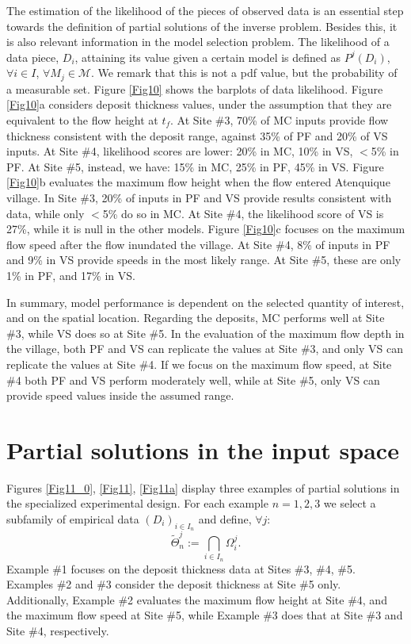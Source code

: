\documentclass[nhess, manuscript]{copernicus}
\begin{document}
The estimation of the likelihood of the pieces of observed data is an essential step towards the definition of partial solutions of the inverse problem. Besides this, it is also relevant information in the model selection problem. The likelihood of a data piece, $D_i$, attaining its value given a certain model is defined as $P^j(D_i)$, $\forall i\in I$, $\forall M_j\in \mathcal M$. We remark that this is not a pdf value, but the probability of a measurable set. Figure \ref{Fig10} shows the barplots of data likelihood. Figure \ref{Fig10}a considers deposit thickness values, under the assumption that they are equivalent to the flow height at $t_f$. At Site \#3, 70\% of MC inputs provide flow thickness consistent with the deposit range, against 35\% of PF and 20\% of VS inputs. At Site \#4, likelihood scores are lower: 20\% in MC, 10\% in VS, $<$5\% in PF. At Site \#5, instead, we have: 15\% in MC, 25\% in PF, 45\% in VS. Figure \ref{Fig10}b evaluates the maximum flow height when the flow entered Atenquique village. In Site \#3, 20\% of inputs in PF and VS provide results consistent with data, while only $<$5\% do so in MC. At Site \#4, the likelihood score of VS is 27\%, while it is null in the other models. Figure \ref{Fig10}c focuses on the maximum flow speed after the flow inundated the village. At Site \#4, 8\% of inputs in PF and 9\% in VS provide speeds in the most likely range. At Site \#5, these are only 1\% in PF, and 17\% in VS.

In summary, model performance is dependent on the selected quantity of interest, and on the spatial location. Regarding the deposits, MC performs well at  Site \#3, while VS does so at Site \#5.  In the evaluation of the maximum flow depth in the village, both PF and VS can replicate the values at Site \#3, and only VS can replicate the values at Site \#4. If we focus on the maximum flow speed, at Site \#4 both PF and VS perform moderately well, while at Site \#5, only VS can provide speed values inside the assumed range.

\section{Partial solutions in the input space}
Figures \ref{Fig11_0}, \ref{Fig11}, \ref{Fig11a} display three examples of partial solutions in the specialized experimental design.
For each example $n=1,2,3$ we select a subfamily of empirical data $(D_i)_{i\in I_n}$ and define, $\forall j$:
\begin{equation}
\tilde\Theta_n^j:=\bigcap_{i\in I_n} \Omega_i^j.
\end{equation}
Example \#1 focuses on the deposit thickness data at Sites \#3, \#4, \#5.  Examples \#2 and \#3 consider the deposit thickness at Site \#5 only. Additionally, Example \#2 evaluates the maximum flow height at Site \#4, and the maximum flow speed at Site \#5, while Example \#3 does that at Site \#3 and Site \#4, respectively.
\end{document}
